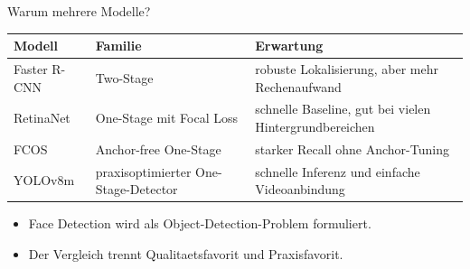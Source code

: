 \begin{frame}{Warum mehrere Modelle?}
\small
\begin{tabularx}{\textwidth}{l l X}
\toprule
Modell & Familie & Erwartung \\
\midrule
Faster R-CNN & Two-Stage & robuste Lokalisierung, aber mehr Rechenaufwand \\
RetinaNet & One-Stage mit Focal Loss & schnelle Baseline, gut bei vielen Hintergrundbereichen \\
FCOS & Anchor-free One-Stage & starker Recall ohne Anchor-Tuning \\
YOLOv8m & praxisoptimierter One-Stage-Detector & schnelle Inferenz und einfache Videoanbindung \\
\bottomrule
\end{tabularx}
\vspace{0.8em}
\begin{itemize}
    \item Face Detection wird als Object-Detection-Problem formuliert.
    \item Der Vergleich trennt Qualitaetsfavorit und Praxisfavorit.
\end{itemize}
\end{frame}
